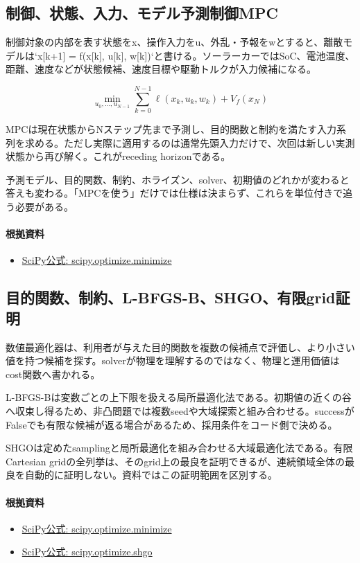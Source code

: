 \documentclass[a4paper,11pt]{article}
\begin{document}
\subsection{制御、状態、入力、モデル予測制御MPC}
制御対象の内部を表す状態をx、操作入力をu、外乱・予報をwとすると、離散モデルは`x[k+1] = f(x[k], u[k], w[k])`と書ける。ソーラーカーではSoC、電池温度、距離、速度などが状態候補、速度目標や駆動トルクが入力候補になる。


\[
\min_{u_0,\ldots,u_{N-1}} \sum_{k=0}^{N-1}\ell(x_k,u_k,w_k)+V_f(x_N)
\]

MPCは現在状態からNステップ先まで予測し、目的関数と制約を満たす入力系列を求める。ただし実際に適用するのは通常先頭入力だけで、次回は新しい実測状態から再び解く。これがreceding horizonである。


予測モデル、目的関数、制約、ホライズン、solver、初期値のどれかが変わると答えも変わる。「MPCを使う」だけでは仕様は決まらず、これらを単位付きで追う必要がある。

\paragraph{根拠資料}
\begin{itemize}[leftmargin=1.6em]
\item \href{https://docs.scipy.org/doc/scipy/reference/generated/scipy.optimize.minimize.html}{SciPy公式: scipy.optimize.minimize}
\end{itemize}

\subsection{目的関数、制約、L-BFGS-B、SHGO、有限grid証明}
数値最適化器は、利用者が与えた目的関数を複数の候補点で評価し、より小さい値を持つ候補を探す。solverが物理を理解するのではなく、物理と運用価値はcost関数へ書かれる。


L-BFGS-Bは変数ごとの上下限を扱える局所最適化法である。初期値の近くの谷へ収束し得るため、非凸問題では複数seedや大域探索と組み合わせる。successがFalseでも有限な候補が返る場合があるため、採用条件をコード側で決める。


SHGOは定めたsamplingと局所最適化を組み合わせる大域最適化法である。有限Cartesian gridの全列挙は、そのgrid上の最良を証明できるが、連続領域全体の最良を自動的に証明しない。資料ではこの証明範囲を区別する。

\paragraph{根拠資料}
\begin{itemize}[leftmargin=1.6em]
\item \href{https://docs.scipy.org/doc/scipy/reference/generated/scipy.optimize.minimize.html}{SciPy公式: scipy.optimize.minimize}
\item \href{https://docs.scipy.org/doc/scipy/reference/generated/scipy.optimize.shgo.html}{SciPy公式: scipy.optimize.shgo}
\end{itemize}
\end{document}
